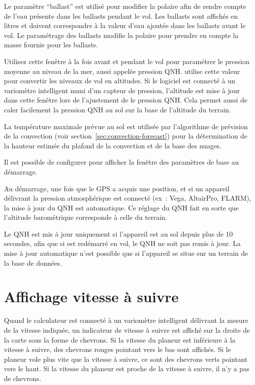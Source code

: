 Le paramètre ``ballast'' est utilisé pour modifier la polaire afin de rendre compte de l'eau présente dans les ballasts pendant le vol.
Les ballasts sont affichés en litres et doivent correspondre à la valeur d'eau ajoutée dans les ballasts avant le vol.
Le paramétrage des ballasts modifie la polaire pour prendre en compte la masse fournie pour les ballasts.

Utilisez cette fenêtre à la fois avant et pendant le vol pour paramétrer le pression moyenne au niveau de la mer, aussi appelée pression QNH.\@
\xc{} utilise cette valeur pour convertir les niveaux de vol en altitudes.
Si le logiciel est connecté à un variomètre intelligent muni d'un capteur de pression, l'altitude est mise à jour dans cette fenêtre lors de l'ajustement de le pression QNH.\@
Cela permet aussi de caler facilement la pression QNH au sol sur la base de l'altitude du terrain.

La température maximale prévue au sol est utilisée par l'algorithme de prévision de la convection (voir section~\ref{sec:convection-forecast}) pour la détermination de la hauteur estimée du plafond de la convection et de la base des nuages.

\tip{} Il est possible de configurer \xc{} pour afficher la fenêtre des paramètres de base au démarrage.

Au démarrage, une fois que le GPS a acquis une position, et si un appareil délivrant la pression atmosphérique est connecté (ex~: Vega, AltairPro, FLARM), la mise à jour du QNH est automatique.
Ce réglage du QNH fait en sorte que l'altitude barométrique corresponde à celle du terrain.

Le QNH est mis à jour uniquement si l'appareil est au sol depuis plus de 10 secondes, afin que si \xc{} est redémarré en vol, le QNH ne soit pas remis à jour.
La mise à jour automatique n'est possible que si l'appareil se situe sur un terrain de la base de données.

\section{Affichage vitesse à suivre}

Quand le calculateur est connecté à un variomètre intelligent délivrant la mesure de la vitesse indiquée, un indicateur de vitesse à suivre est affiché sur la droite de la carte sous la forme de chevrons.
Si la vitesse du planeur est inférieure à la vitesse à suivre, des chevrons rouges pointant vers le bas sont affichés.
Si le planeur vole plus vite que la vitesse à suivre, ce sont des chevrons verts pointant vers le haut.
Si la vitesse du planeur est proche de la vitesse à suivre, il n'y a pas de chevrons.

